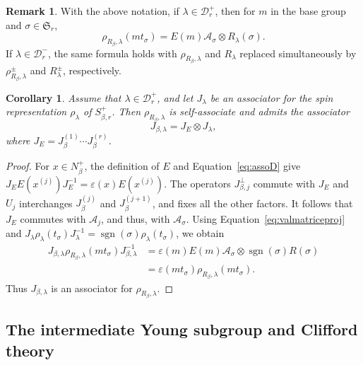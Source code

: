 \documentclass[reqno]{amsart}
\DeclareMathOperator{\sgn}{sgn}
\newcommand{\sym}{\mathfrak{S}}
\newtheorem{corollary}[theorem]{Corollary}
\theoremstyle{definition}
\newtheorem{remark}[theorem]{Remark}
\begin{document}
\begin{remark}
\label{rk:notR}
With the above notation, if $\lambda\in\mathcal D_r^+$, then for $m$ in
the base group and $\sigma\in\sym_r$,
\begin{equation}
\label{eq:valmatriceproj}
\rho_{R_\beta,\lambda}(m t_\sigma)
=
E(m)\mathcal A_\sigma\otimes R_\lambda(\sigma).
\end{equation}
If $\lambda\in\mathcal D_r^-$, the same formula holds with
$\rho_{R_\beta,\lambda}$ and $R_\lambda$ replaced simultaneously by
$\rho_{R_\beta,\lambda}^\pm$ and $R_\lambda^\pm$, respectively.
\end{remark}


\begin{corollary}
\label{cor:assogen}
Assume that $\lambda\in\mathcal D_r^+$, and let $J_\lambda$ be an
associator for the spin representation $\rho_\lambda$ of $S_{\beta,r}^+$.
Then $\rho_{R_\beta,\lambda}$ is self-associate and admits the associator
\[
J_{\beta,\lambda}
=
J_E\otimes J_\lambda,
\]
where $J_E=J_\beta^{(1)}\cdots J_\beta^{(r)}$. 
\end{corollary}

\begin{proof}
For $x\in N_\beta^+$, the definition of $E$ and
Equation~\eqref{eq:assoD} give
$
J_EE(x^{(j)})J_E^{-1}
=
\varepsilon(x)E(x^{(j)})$.
The operators $J_{\beta,j}^\perp$ commute with $J_E$ and $U_j$
interchanges $J_\beta^{(j)}$ and $J_\beta^{(j+1)}$, and fixes all the
other factors. It follows that $J_E$ commutes with $\mathcal A_j$, and
thus, with $\mathcal A_\sigma$. 
Using Equation~\eqref{eq:valmatriceproj} and $
J_\lambda\rho_\lambda(t_\sigma)J_\lambda^{-1}
=
\sgn(\sigma)\rho_\lambda(t_\sigma)$, we obtain
\[
\begin{aligned}
J_{\beta,\lambda}
\rho_{R_\beta,\lambda}(m t_\sigma)
J_{\beta,\lambda}^{-1}
&=
\varepsilon(m)E(m)\mathcal A_\sigma
 \otimes
\sgn(\sigma)R(\sigma)\\
&=
\varepsilon(m t_\sigma)
\rho_{R_\beta,\lambda}(m t_\sigma).
\end{aligned}
\]
Thus $J_{\beta,\lambda}$ is an associator for $\rho_{R_\beta,\lambda}$.
\end{proof}

\subsection{The intermediate Young subgroup and Clifford theory}
\end{document}
